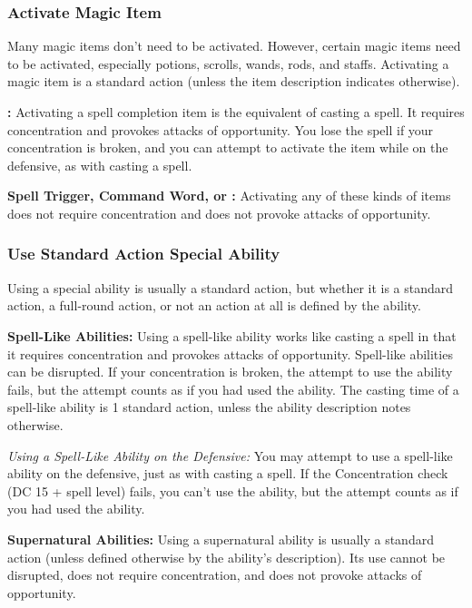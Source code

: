 \subsubsection{Activate Magic Item}

Many magic items don't need to be activated. However, certain magic items need to be activated, especially potions, scrolls, wands, rods, and staffs. Activating a magic item is a standard action (unless the item description indicates otherwise).

\textbf{:} Activating a spell completion item is the equivalent of casting a spell. It requires concentration and provokes attacks of opportunity. You lose the spell if your concentration is broken, and you can attempt to activate the item while on the defensive, as with casting a spell.

\textbf{Spell Trigger, Command Word, or :} Activating any of these kinds of items does not require concentration and does not provoke attacks of opportunity.

\subsubsection{Use Standard Action Special Ability}

Using a special ability is usually a standard action, but whether it is a standard action, a full-round action, or not an action at all is defined by the ability.

\textbf{Spell-Like Abilities:} Using a spell-like ability works like casting a spell in that it requires concentration and provokes attacks of opportunity. Spell-like abilities can be disrupted. If your concentration is broken, the attempt to use the ability fails, but the attempt counts as if you had used the ability. The casting time of a spell-like ability is 1 standard action, unless the ability description notes otherwise.

\textit{Using a Spell-Like Ability on the Defensive:} You may attempt to use a spell-like ability on the defensive, just as with casting a spell. If the Concentration check (DC 15 + spell level) fails, you can't use the ability, but the attempt counts as if you had used the ability.

\textbf{Supernatural Abilities:} Using a supernatural ability is usually a standard action (unless defined otherwise by the ability's description). Its use cannot be disrupted, does not require concentration, and does not provoke attacks of opportunity.

